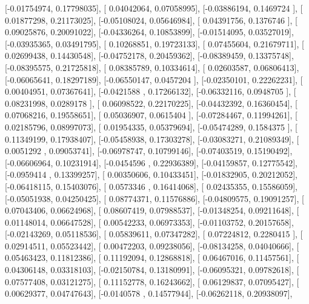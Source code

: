 \documentclass{article}
\begin{document}
       [-0.01754974,  0.17798035],
       [ 0.04042064,  0.07058995],
       [-0.03886194,  0.1469724 ],
       [ 0.01877298,  0.21173025],
       [-0.05108024,  0.05646984],
       [ 0.04391756,  0.1376746 ],
       [ 0.09025876,  0.20091022],
       [-0.04336264,  0.10853899],
       [-0.01514095,  0.03527019],
       [-0.03935365,  0.03491795],
       [ 0.10268851,  0.19723133],
       [ 0.07455604,  0.21679711],
       [ 0.02699438,  0.14430548],
       [-0.04752178,  0.20459362],
       [-0.08389459,  0.13375748],
       [-0.08395575,  0.21725818],
       [ 0.08385789,  0.10334614],
       [ 0.02603587,  0.06806413],
       [-0.06065641,  0.18297189],
       [-0.06550147,  0.0457204 ],
       [-0.02350101,  0.22262231],
       [ 0.00404951,  0.07367641],
       [-0.0421588 ,  0.17266132],
       [-0.06332116,  0.0948705 ],
       [ 0.08231998,  0.0289178 ],
       [ 0.06098522,  0.22170225],
       [-0.04432392,  0.16360454],
       [ 0.07068216,  0.19558651],
       [ 0.05036907,  0.0615404 ],
       [-0.07284467,  0.11994261],
       [ 0.02185796,  0.08997073],
       [ 0.01954335,  0.05379694],
       [-0.05474289,  0.1584375 ],
       [ 0.11349199,  0.17938407],
       [-0.05458938,  0.17303278],
       [-0.03083271,  0.21089349],
       [ 0.0051292 ,  0.09053741],
       [-0.06978747,  0.10799146],
       [-0.07403519,  0.15190492],
       [-0.06606964,  0.10231914],
       [-0.0454596 ,  0.22936389],
       [-0.04159857,  0.12775542],
       [-0.0959414 ,  0.13399257],
       [ 0.00350606,  0.10433451],
       [-0.01832905,  0.20212052],
       [-0.06418115,  0.15403076],
       [ 0.0573346 ,  0.16414068],
       [ 0.02435355,  0.15586059],
       [-0.05051938,  0.04250425],
       [ 0.08774371,  0.11576886],
       [-0.04809575,  0.19091257],
       [ 0.07043406,  0.06624968],
       [ 0.08607419,  0.07988537],
       [-0.01348254,  0.09211648],
       [ 0.01148014,  0.06647528],
       [ 0.00542233,  0.06973353],
       [-0.01103752,  0.20157658],
       [-0.02143269,  0.05118536],
       [ 0.05839611,  0.07347282],
       [ 0.07224812,  0.2280415 ],
       [ 0.02914511,  0.05523442],
       [ 0.00472203,  0.09238056],
       [-0.08134258,  0.04040666],
       [ 0.05463423,  0.11812386],
       [ 0.11192094,  0.12868818],
       [ 0.06467016,  0.11457561],
       [ 0.04306148,  0.03318103],
       [-0.02150784,  0.13180991],
       [-0.06095321,  0.09782618],
       [ 0.07577408,  0.03121275],
       [ 0.11152778,  0.16243662],
       [ 0.06129837,  0.07095427],
       [ 0.00629377,  0.04747643],
       [-0.0140578 ,  0.14577944],
       [-0.06262118,  0.20938097],
\end{document}
